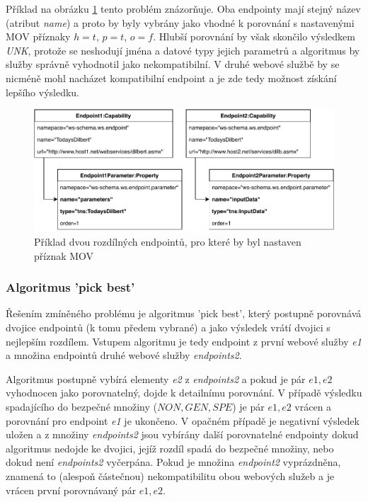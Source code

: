 \documentclass[czech,DP]{thesiskiv}
\begin{document}
Příklad na obrázku \ref{fig:mov-bad-example} tento problém znázorňuje. Oba endpointy mají stejný název (atribut \textit{name}) a proto by byly vybrány jako vhodné k porovnání s nastavenými MOV příznaky $h=t$, $p=t$, $o=f$. Hlubší porovnání by však skončilo výsledkem \textit{UNK}, protože se neshodují jména a datové typy jejich parametrů a algoritmus by služby správně vyhodnotil jako nekompatibilní. V druhé webové službě by se nicméně mohl nacházet kompatibilní endpoint a je zde tedy možnost získání lepšího výsledku.

\begin{figure}[h]
	\centering
	\includegraphics[width=\linewidth]{mov-example-bad}
	\caption{Příklad dvou rozdílných endpointů, pro které by byl nastaven příznak MOV}
	\label{fig:mov-bad-example}
\end{figure}

\subsubsection{Algoritmus 'pick best'}
Řešením zmíněného problému je algoritmus 'pick  best', který postupně porovnává dvojice endpointů (k tomu předem vybrané) a jako výsledek vrátí dvojici s nejlepším rozdílem. Vstupem algoritmu je tedy endpoint z první webové služby \textit{e1} a množina endpointů druhé webové služby \textit{endpoints2}. 

Algoritmus postupně vybírá elementy \textit{e2} z \textit{endpoints2} a pokud je pár $e1,e2$ vyhodnocen jako porovnatelný, dojde k detailnímu porovnání. V případě výsledku spadajícího do bezpečné množiny (${NON, GEN, SPE}$) je pár $e1,e2$ vrácen a porovnání pro endpoint \textit{e1} je ukončeno. V opačném případě je negativní výsledek uložen a z množiny \textit{endpoints2} jsou vybírány další porovnatelné endpointy dokud algoritmus nedojde ke dvojici, jejíž rozdíl spadá do bezpečné množiny, nebo dokud není \textit{endpoints2} vyčerpána. Pokud je množina \textit{endpoint2} vyprázdněna, znamená to (alespoň částečnou) nekompatibilitu obou webových služeb a je vrácen první porovnávaný pár $e1,e2$.
\end{document}
